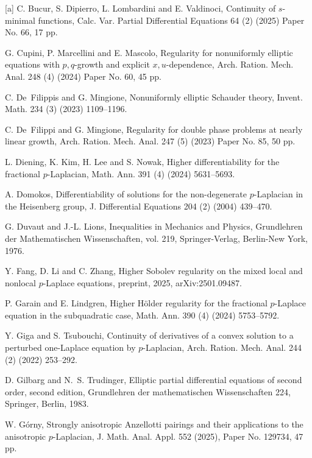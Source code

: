 \documentclass[reqno,10pt]{amsart}
\numberwithin{equation}{section}
\begin{document}
\begin{thebibliography}{[a]}
		 C. Bucur, S. Dipierro, L. Lombardini and E. Valdinoci, Continuity of $s$-minimal functions, Calc. Var. Partial Differential Equations 64 (2) (2025) Paper No. 66, 17 pp.
		
		 G. Cupini, P. Marcellini and E. Mascolo, Regularity for nonuniformly elliptic equations with $p,q$-growth and explicit $x,u$-dependence, Arch. Ration. Mech. Anal. 248 (4) (2024) Paper No. 60, 45 pp.
		
		 C. De~Filippis and G. Mingione, Nonuniformly elliptic Schauder theory, Invent. Math. 234 (3) (2023) 1109--1196.
		
		 C. De~Filippi and G. Mingione, Regularity for double phase problems at nearly linear growth, Arch. Ration. Mech. Anal. 247 (5) (2023) Paper No. 85, 50 pp.
		
		 L. Diening, K. Kim, H. Lee and S. Nowak, Higher differentiability for the fractional $p$-Laplacian, Math. Ann. 391 (4) (2024) 5631--5693.
		
		 A. Domokos, Differentiability of solutions for the non-degenerate $p$-Laplacian in the Heisenberg group, J. Differential Equations  204 (2) (2004) 439--470.
		
		 G. Duvaut and J.-L. Lions, Inequalities in Mechanics and Physics, Grundlehren der Mathematischen Wissenschaften, vol. 219, Springer-Verlag, Berlin-New York, 1976.

		 Y. Fang, D. Li and C. Zhang, Higher Sobolev regularity on the mixed local and nonlocal $p$-Laplace equations, preprint, 2025, arXiv:2501.09487.
		
		 P. Garain and E. Lindgren, Higher H\"older regularity for the fractional $p$-Laplace equation in the subquadratic case, Math. Ann. 390 (4) (2024) 5753--5792.
		
		 Y. Giga and S. Tsubouchi, Continuity of derivatives of a convex solution to a perturbed one-Laplace equation by $p$-Laplacian, Arch. Ration. Mech. Anal. 244 (2) (2022) 253--292.
		
		 D. Gilbarg and N.~S. Trudinger, Elliptic partial differential equations of second order, second edition, Grundlehren der mathematischen Wissenschaften  224, Springer, Berlin, 1983.
		
		 W. G\'{o}rny, Strongly anisotropic Anzellotti pairings and their applications to the anisotropic $p$-Laplacian, J. Math. Anal. Appl. 552 (2025), Paper No. 129734, 47 pp.
		

\end{thebibliography}
\end{document}
